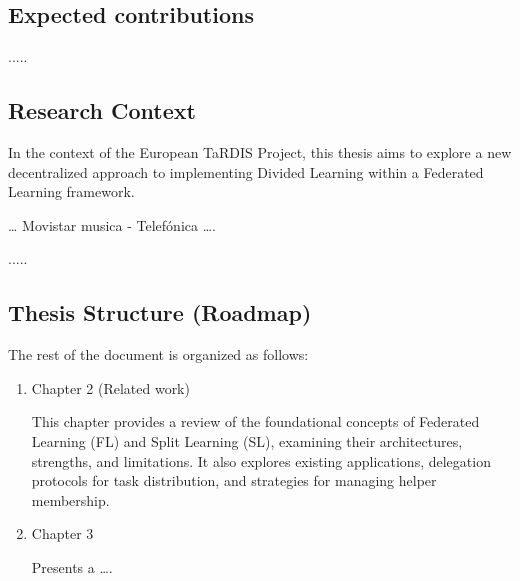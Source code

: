 \subsection{Expected contributions}
\label{sub:expectedContributions}


.....

\subsection{Research Context}
\label{sub:ResearchContext}

In the context of the European TaRDIS Project, this thesis aims to explore a new decentralized approach to implementing Divided Learning within a Federated Learning framework. 

… Movistar musica - Telefónica ….

.....

\subsection{Thesis Structure (Roadmap)}
\label{sub:roadMap}

The rest of the document is organized as follows:

\begin{enumerate}

 \item Chapter 2 (Related work)
 
 This chapter provides a review of the foundational concepts of Federated Learning (FL) and Split Learning (SL), examining their architectures, strengths, and limitations. It also explores existing applications, delegation protocols for task distribution, and strategies for managing helper membership.

 \item Chapter 3 
 
 Presents a ….
 

\end{enumerate}



